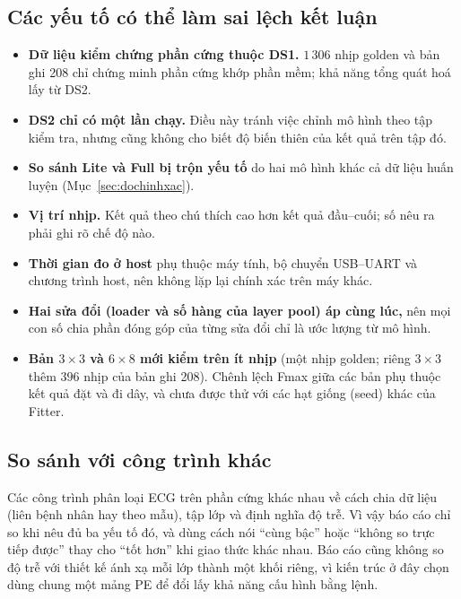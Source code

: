 \subsection{Các yếu tố có thể làm sai lệch kết luận}
\begin{itemize}
  \item \textbf{Dữ liệu kiểm chứng phần cứng thuộc DS1.} $1\,306$ nhịp golden và bản ghi 208 chỉ chứng minh phần cứng khớp phần mềm; khả năng tổng quát hoá lấy từ DS2.
  \item \textbf{DS2 chỉ có một lần chạy.} Điều này tránh việc chỉnh mô hình theo tập kiểm tra, nhưng cũng không cho biết độ biến thiên của kết quả trên tập đó.
  \item \textbf{So sánh Lite và Full bị trộn yếu tố} do hai mô hình khác cả dữ liệu huấn luyện (Mục~\ref{sec:dochinhxac}).
  \item \textbf{Vị trí nhịp.} Kết quả theo chú thích cao hơn kết quả đầu--cuối; số nêu ra phải ghi rõ chế độ nào.
  \item \textbf{Thời gian đo ở host} phụ thuộc máy tính, bộ chuyển USB--UART và chương trình host, nên không lặp lại chính xác trên máy khác.
  \item \textbf{Hai sửa đổi (loader và số hàng của layer pool) áp cùng lúc,} nên mọi con số chia phần đóng góp của từng sửa đổi chỉ là ước lượng từ mô hình.
  \item \textbf{Bản $3\times3$ và $6\times8$ mới kiểm trên ít nhịp} (một nhịp golden; riêng $3\times3$ thêm $396$ nhịp của bản ghi 208). Chênh lệch Fmax giữa các bản phụ thuộc kết quả đặt và đi dây, và chưa được thử với các hạt giống (seed) khác của Fitter.
\end{itemize}

\subsection{So sánh với công trình khác}
Các công trình phân loại ECG trên phần cứng khác nhau về cách chia dữ liệu (liên bệnh nhân hay theo mẫu), tập lớp và định nghĩa độ trễ.
Vì vậy báo cáo chỉ so khi nêu đủ ba yếu tố đó, và dùng cách nói ``cùng bậc'' hoặc ``không so trực tiếp được'' thay cho ``tốt hơn'' khi giao thức khác nhau.
Báo cáo cũng không so độ trễ với thiết kế ánh xạ mỗi lớp thành một khối riêng, vì kiến trúc ở đây chọn dùng chung một mảng PE để đổi lấy khả năng cấu hình bằng lệnh.
